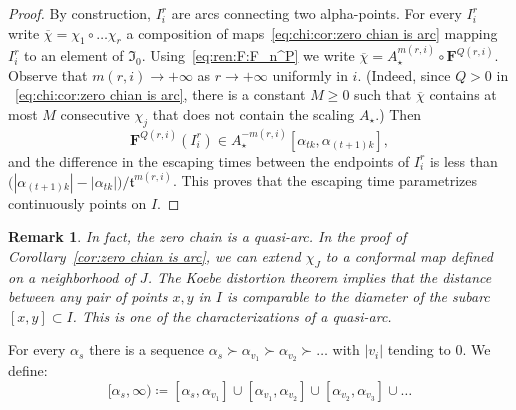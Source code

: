 \documentclass{amsart}
\newcommand{\1}{{\mathbb 1 }}
\newcommand\binfty{{\infty}}%
\newcommand\mI{{\mathfrak I}}
\newcommand{\bF}{{\mathbf F}}
\newcommand{\str}{{\star}}
\renewcommand{\tt}{\mathfrak{t}}
\newtheorem{rem}[thm]{Remark}
\theoremstyle{remark}
\numberwithin{equation}{section}
\theoremstyle{definition}
\theoremstyle{nonumberbreak}
\begin{document}
\begin{proof}
By construction, $I^r_i$ are arcs connecting two alpha-points. For every $I^r_i$ write $\overline \chi =\chi_1\circ \dots \chi_{r}$ 
a composition of maps~\eqref{eq:chi:cor:zero chian is arc} mapping  $I^r_i$ to an element of $\mI_0$.  Using~\eqref{eq:ren:F:F_n^P} we write $\overline \chi =A^{m(r,i)}_\str\circ \bF^{Q(r,i)}$. Observe that $m(r,i)\to +\infty$ as $r\to +\infty$ uniformly in $i$. (Indeed, since $Q>0$ in ~\eqref{eq:chi:cor:zero chian is arc}, there is a constant $M\ge 0$ such that $\overline \chi$ contains at most $M$ consecutive $\chi_j$ that does not contain the scaling $A_\str$.) Then \[\bF^{Q(r,i)}(I^r_i)\in  A_\str^{-m(r,i)} [\alpha_{tk},\alpha_{(t+1)k}],\] and the difference in the escaping times between the endpoints of $I^r_{i}$ is less than $\big(|\alpha_{(t+1)k}|-|\alpha_{tk}|\big)/\tt^{m(r,i)}$. This proves that the escaping time parametrizes continuously points on $I$.
\end{proof}


\begin{rem}
In fact, the zero chain is a quasi-arc. In the proof of Corollary~\ref{cor:zero chian is arc}, we can extend $\chi_J$ to a conformal map defined on a neighborhood of $J$. The Koebe distortion theorem implies that the distance between any pair of points $x,y$ in $I$ is comparable to the diameter of the subarc $[x,y]\subset I$. This is one of the characterizations of a quasi-arc.
\end{rem}

For every $\alpha_s$ there is a sequence $\alpha_s \succ \alpha_{v_1}\succ \alpha_{v_2}\succ \dots$ with $|v_i|$ tending to $0$. We define:
\[ [\alpha_s,\binfty)\coloneqq [\alpha_s,\alpha_{v_1}]\cup [\alpha_{v_1},\alpha_{v_2}]\cup [\alpha_{v_2},\alpha_{v_3}]\cup \dots  \]
\end{document}
